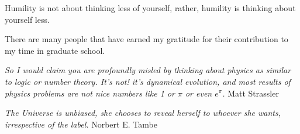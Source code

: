 
Humility is not about thinking less of yourself, rather, humility is thinking about yourself less.


There are many people that have earned my gratitude for their contribution to my
time in graduate school. 


\textit{So I would claim you are profoundly misled by thinking about physics as similar to logic or number theory. It’s not! it’s dynamical evolution, and most results of physics problems are not nice numbers like 1 or $\pi$ or even $e^{\pi}$.}
\newline
\textsf{Matt Strassler}
\par 
\textit{The Universe is unbiased, she chooses to reveal herself to whoever she wants, irrespective of the label.}
\newline
Norbert E. Tambe


